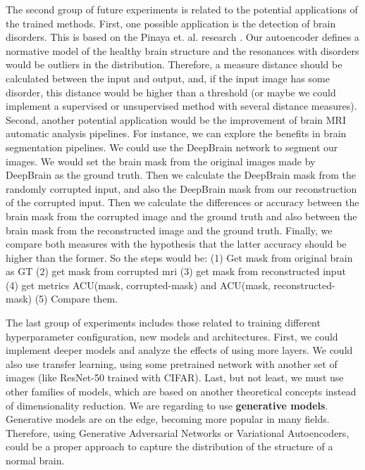 The second group of future experiments is related to the potential applications of the trained methods. First, one possible application is the detection of brain disorders. This is based on the Pinaya et. al. research \cite{pinaya2019}. Our autoencoder defines a normative model of the healthy brain structure and the resonances with disorders would be outliers in the distribution. Therefore, a measure distance should be calculated between the input and output, and, if the input image has some disorder, this distance would be higher than a threshold (or maybe we could implement a supervised or unsupervised method with several distance measures). Second, another potential application would be the improvement of brain MRI automatic analysis pipelines. For instance, we can explore the benefits in brain segmentation pipelines. We could use the DeepBrain network to segment our images. We would set the brain mask from the original images made by DeepBrain as the ground truth. Then we calculate the DeepBrain mask from the randomly corrupted input, and also the DeepBrain mask from our reconstruction of the corrupted input. Then we calculate the differences or accuracy between the brain mask from the corrupted image and the ground truth and also between the brain mask from the reconstructed image and the ground truth. Finally, we compare both measures with the hypothesis that the latter accuracy should be higher than the former. So the steps would be: (1) Get mask from original brain as GT (2) get mask from corrupted mri (3) get mask from reconstructed input (4) get metrics ACU(mask, corrupted-mask) and ACU(mask, reconstructed-mask) (5) Compare them.


The last group of experiments includes those related to training different hyperparameter configuration, new models and architectures. First, we could implement deeper models and analyze the effects of using more layers. We could also use transfer learning, using some pretrained network with another set of images (like ResNet-50 trained with CIFAR). Last, but not least, we must use other families of models, which are based on another theoretical concepts instead of dimensionality reduction. We are regarding to use \textbf{generative models}. Generative models are on the edge, becoming more popular in many fields. Therefore, using Generative Adversarial Networks or Variational Autoencoders, could be a proper approach to capture the distribution of the structure of a normal brain. 
